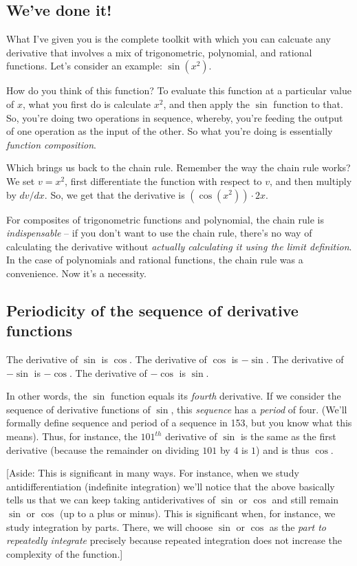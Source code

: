 \documentclass[10pt]{amsart}
\begin{document}
\subsection{We've done it!}

What I've given you is the complete toolkit with which you can
calcuate any derivative that involves a mix of trigonometric,
polynomial, and rational functions. Let's consider an example:
$\sin(x^2)$.

How do you think of this function? To evaluate this function at a
particular value of $x$, what you first do is calculate $x^2$, and
then apply the $\sin$ function to that. So, you're doing two
operations in sequence, whereby, you're feeding the output of one
operation as the input of the other. So what you're doing is
essentially {\em function composition}.

Which brings us back to the chain rule. Remember the way the chain
rule works? We set $v = x^2$, first differentiate the function with
respect to $v$, and then multiply by $dv/dx$. So, we get that the
derivative is $(\cos(x^2)) \cdot 2x$.

For composites of trigonometric functions and polynomial, the chain
rule is {\em indispensable} -- if you don't want to use the chain
rule, there's no way of calculating the derivative without {\em
actually calculating it using the limit definition}. In the case of
polynomials and rational functions, the chain rule was a
convenience. Now it's a necessity.

\subsection{Periodicity of the sequence of derivative functions}

The derivative of $\sin$ is $\cos$. The derivative of $\cos$ is
$-\sin$. The derivative of $-\sin$ is $-\cos$. The derivative of
$-\cos$ is $\sin$.

In other words, the $\sin$ function equals its {\em fourth}
derivative. If we consider the sequence of derivative functions of
$\sin$, this {\em sequence} has a {\em period} of four. (We'll
formally define sequence and period of a sequence in 153, but you know
what this means). Thus, for instance, the $101^{th}$ derivative of
$\sin$ is the same as the first derivative (because the remainder on
dividing $101$ by $4$ is $1$) and is thus $\cos$.

[Aside: This is significant in many ways. For instance, when we study
antidifferentiation (indefinite integration) we'll notice that the
above basically tells us that we can keep taking antiderivatives of
$\sin$ or $\cos$ and still remain $\sin$ or $\cos$ (up to a plus or
minus). This is significant when, for instance, we study integration
by parts. There, we will choose $\sin$ or $\cos$ as the {\em part to
repeatedly integrate} precisely because repeated integration does not
increase the complexity of the function.]
\end{document}
